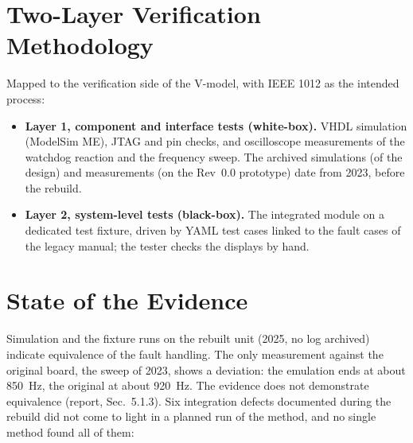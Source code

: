 \documentclass[a4paper,10pt]{article}
\begin{document}
\section{Two-Layer Verification Methodology}
Mapped to the verification side of the V-model, with IEEE 1012 as the intended process:

\begin{itemize}
  \item \textbf{Layer 1, component and interface tests (white-box).} VHDL simulation (ModelSim ME), JTAG and pin checks, and oscilloscope measurements of the watchdog reaction and the frequency sweep. The archived simulations (of the design) and measurements (on the Rev~0.0 prototype) date from 2023, before the rebuild.
  \item \textbf{Layer 2, system-level tests (black-box).} The integrated module on a dedicated test fixture, driven by YAML test cases linked to the fault cases of the legacy manual; the tester checks the displays by hand.
\end{itemize}

\section{State of the Evidence}
Simulation and the fixture runs on the rebuilt unit (2025, no log archived) indicate equivalence of the fault handling. The only measurement against the original board, the sweep of 2023, shows a deviation: the emulation ends at about \SI{850}{\hertz}, the original at about \SI{920}{\hertz}. The evidence does not demonstrate equivalence (report, Sec.~5.1.3). Six integration defects documented during the rebuild did not come to light in a planned run of the method, and no single method found all of them:
\end{document}
